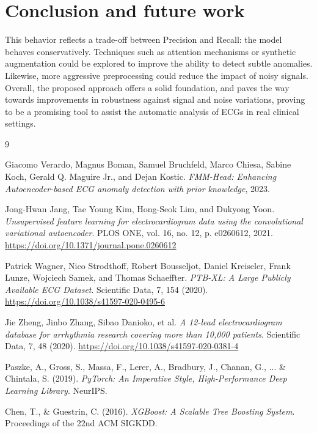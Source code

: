 \documentclass[11pt]{article}
\begin{document}
\section{Conclusion and future work}
This behavior reflects a trade-off between Precision and Recall: the model behaves conservatively. Techniques such as attention mechanisms or synthetic augmentation could be explored to improve the ability to detect subtle anomalies. Likewise, more aggressive preprocessing could reduce the impact of noisy signals. Overall, the proposed approach offers a solid foundation, and paves the way towards improvements in robustness against signal and noise variations, proving to be a promising tool to assist the automatic analysis of ECGs in real clinical settings.




\begin{thebibliography}{9}



Giacomo Verardo, Magnus Boman, Samuel Bruchfeld, Marco Chiesa, Sabine Koch, Gerald Q. Maguire Jr., and Dejan Kostic.
\textit{FMM-Head: Enhancing Autoencoder-based ECG anomaly detection with prior knowledge}, 2023.

Jong-Hwan Jang, Tae Young Kim, Hong-Seok Lim, and Dukyong Yoon.
\textit{Unsupervised feature learning for electrocardiogram data using the convolutional variational autoencoder}.
PLOS ONE, vol. 16, no. 12, p. e0260612, 2021.
\url{https://doi.org/10.1371/journal.pone.0260612}

Patrick Wagner, Nico Strodthoff, Robert Bousseljot, Daniel Kreiseler, Frank Lunze, Wojciech Samek, and Thomas Schaeffter.
\textit{PTB-XL: A Large Publicly Available ECG Dataset}. Scientific Data, 7, 154 (2020).
\url{https://doi.org/10.1038/s41597-020-0495-6}

Jie Zheng, Jinbo Zhang, Sibao Danioko, et al.
\textit{A 12-lead electrocardiogram database for arrhythmia research covering more than 10,000 patients}. Scientific Data, 7, 48 (2020).
\url{https://doi.org/10.1038/s41597-020-0381-4}

Paszke, A., Gross, S., Massa, F., Lerer, A., Bradbury, J., Chanan, G., ... \& Chintala, S. (2019).
\textit{PyTorch: An Imperative Style, High-Performance Deep Learning Library}. NeurIPS.

Chen, T., \& Guestrin, C. (2016).
\textit{XGBoost: A Scalable Tree Boosting System}. Proceedings of the 22nd ACM SIGKDD.


\end{thebibliography}
\end{document}
